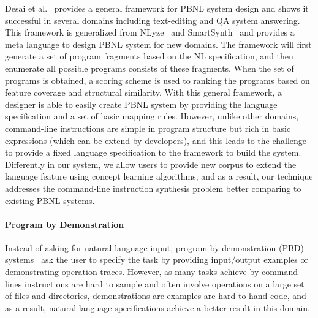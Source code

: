 Desai et al.~\cite{DBLP:journals/corr/DesaiGHJKMRR15} provides a general framework for PBNL system design and shows it successful in several domains including text-editing and QA system answering. This framework is generalized from NLyze~\cite{DBLP:conf/sigmod/GulwaniM14} and SmartSynth~\cite{DBLP:conf/mobisys/LeGS13} and provides a meta language to design PBNL system for new domains. The framework will first generate a set of program fragments based on the NL specification, and then enumerate all possible programs consists of these fragments. When the set of programs is obtained, a scoring scheme is used to ranking the programs based on feature coverage and structural similarity. With this general framework, a designer is able to easily create PBNL system by providing the language specification and a set of basic mapping rules. However, unlike other domains, command-line instructions are simple in program structure but rich in basic expressions (which can be extend by developers), and this leads to the challenge to provide a fixed language specification to the framework to build the system. Differently in our system, we allow users to provide new corpus to extend the language feature using concept learning algorithms, and as a result, our technique addresses the command-line instruction synthesis problem better comparing to existing PBNL systems.

\paragraph{Program by Demonstration} Instead of asking for natural language input, program by demonstration (PBD) systems~\cite{DBLP:journals/ml/LauWDW03, DBLP:journals/cacm/GulwaniHS12, DBLP:conf/pldi/HarrisG11, DBLP:conf/popl/Gulwani11} ask the user to specify the task by providing input/output examples or demonstrating operation traces. However, as many tasks achieve by command lines instructions are hard to sample and often involve operations on a large set of files and directories, demonstrations are examples are hard to hand-code, and as a result, natural language specifications achieve a better result in this domain.

